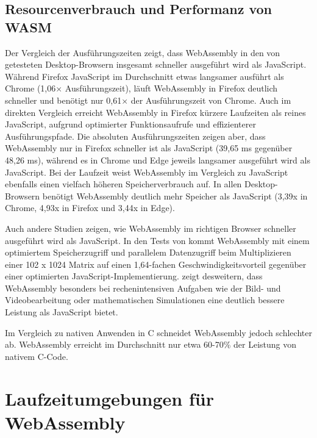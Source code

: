 \subsection{Resourcenverbrauch und Performanz von WASM}
\label{subsec:ResourcenverbrauchundPerformanzvonWASM}

Der Vergleich der Ausführungszeiten zeigt, dass WebAssembly in den von \cite{10.1145/3487552.3487827} getesteten Desktop-Browsern insgesamt schneller ausgeführt wird als JavaScript.
Während Firefox JavaScript im Durchschnitt etwas langsamer ausführt als Chrome (1,06× Ausführungszeit), läuft WebAssembly in Firefox deutlich schneller und benötigt nur 0,61× der Ausführungszeit von Chrome. 
Auch im direkten Vergleich erreicht WebAssembly in Firefox kürzere Laufzeiten als reines JavaScript, aufgrund optimierter Funktionsaufrufe und effizienterer Ausführungspfade.
Die absoluten Ausführungszeiten zeigen aber, dass WebAssembly nur in Firefox schneller ist als JavaScript (39,65 ms gegenüber 48,26 ms), während es in Chrome und Edge jeweils langsamer ausgeführt wird als JavaScript.
Bei der Laufzeit weist WebAssembly im Vergleich zu JavaScript ebenfalls einen vielfach höheren Speicherverbrauch auf.
In allen Desktop-Browsern benötigt WebAssembly deutlich mehr Speicher als JavaScript (3,39x in Chrome, 4,93x in Firefox und 3,44x in Edge). 
\cite{10.1145/3487552.3487827}

Auch andere Studien zeigen, wie WebAssembly im richtigen Browser schneller ausgeführt wird als JavaScript. 
In den Tests von \cite{PoltavskyiDmytro2025} kommt WebAssembly mit einem optimiertem Speicherzugriff und parallelem Datenzugriff beim Multiplizieren einer 102 x 1024 Matrix auf einen 1,64-fachen Geschwindigkeitsvorteil gegenüber einer optimierten JavaScript-Implementierung.
\cite{Talu2025WebAssemblyRuntimes} zeigt desweitern, dass WebAssembly besonders bei rechenintensiven Aufgaben wie der Bild- und Videobearbeitung oder mathematischen Simulationen eine deutlich bessere Leistung als JavaScript bietet.

Im Vergleich zu nativen Anwenden in C schneidet WebAssembly jedoch schlechter ab.
WebAssembly erreicht im Durchschnitt nur etwa 60-70\% der Leistung von nativem C-Code.
\cite{Herrera2018WebAssembly} \cite{Jangda2019NotSoFast}

\section{Laufzeitumgebungen für WebAssembly}
\label{sec:LaufzeitumgebungenfürWebAssembly}

